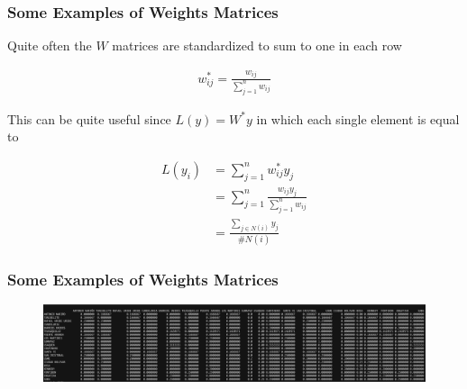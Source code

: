 \documentclass[
  shownotes,
  xcolor={svgnames},
  hyperref={colorlinks,citecolor=DarkBlue,linkcolor=DarkRed,urlcolor=DarkBlue}
   , aspectratio=169]{beamer}
\begin{document}
\begin{frame}[fragile]
\frametitle{Some Examples of Weights Matrices}
Quite often the $W$ matrices are standardized to sum to one in each row

\begin{align}
w^*_{ij}=\frac{w_{ij}}{\sum_{j=1}^n w_{ij}}
\end{align}

This can be quite useful since $L(y) =W^{*} y$ in which each single element is equal to

\begin{align}
L(y_i) &= \sum_{j=1}^n w^*_{ij}y_j \\ \nonumber
&= \sum_{j=1}^n \frac{w_{ij}y_j}{\sum_{j=1}^n w_{ij}}  \\
&= \frac{\sum_{j\in N(i)}y_j}{\# N(i)}
\end{align}
\end{frame}
\begin{frame}[fragile]
\frametitle{Some Examples of Weights Matrices}

  \begin{figure}[H] \centering
    \captionsetup{justification=centering}
    \includegraphics[scale=0.45]{figures/matrix_loc_row_stand}
   \end{figure}

\end{frame}
\end{document}
